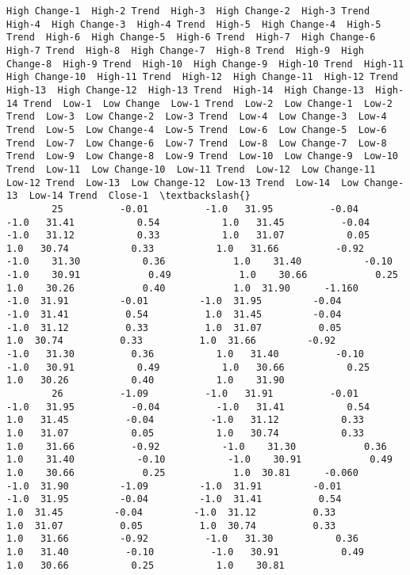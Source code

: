 \documentclass[11pt]{article}
\begin{document}
\begin{Verbatim}[commandchars=\\\{\}]
            High Change-1  High-2 Trend  High-3  High Change-2  High-3 Trend  High-4  High Change-3  High-4 Trend  High-5  High Change-4  High-5 Trend  High-6  High Change-5  High-6 Trend  High-7  High Change-6  High-7 Trend  High-8  High Change-7  High-8 Trend  High-9  High Change-8  High-9 Trend  High-10  High Change-9  High-10 Trend  High-11  High Change-10  High-11 Trend  High-12  High Change-11  High-12 Trend  High-13  High Change-12  High-13 Trend  High-14  High Change-13  High-14 Trend  Low-1  Low Change  Low-1 Trend  Low-2  Low Change-1  Low-2 Trend  Low-3  Low Change-2  Low-3 Trend  Low-4  Low Change-3  Low-4 Trend  Low-5  Low Change-4  Low-5 Trend  Low-6  Low Change-5  Low-6 Trend  Low-7  Low Change-6  Low-7 Trend  Low-8  Low Change-7  Low-8 Trend  Low-9  Low Change-8  Low-9 Trend  Low-10  Low Change-9  Low-10 Trend  Low-11  Low Change-10  Low-11 Trend  Low-12  Low Change-11  Low-12 Trend  Low-13  Low Change-12  Low-13 Trend  Low-14  Low Change-13  Low-14 Trend  Close-1  \textbackslash{}
        25          -0.01          -1.0   31.95          -0.04          -1.0   31.41           0.54           1.0   31.45          -0.04          -1.0   31.12           0.33           1.0   31.07           0.05           1.0   30.74           0.33           1.0   31.66          -0.92          -1.0    31.30           0.36            1.0    31.40           -0.10           -1.0    30.91            0.49            1.0    30.66            0.25            1.0    30.26            0.40            1.0  31.90      -1.160         -1.0  31.91         -0.01         -1.0  31.95         -0.04         -1.0  31.41          0.54          1.0  31.45         -0.04         -1.0  31.12          0.33          1.0  31.07          0.05          1.0  30.74          0.33          1.0  31.66         -0.92         -1.0   31.30          0.36           1.0   31.40          -0.10          -1.0   30.91           0.49           1.0   30.66           0.25           1.0   30.26           0.40           1.0    31.90   
        26          -1.09          -1.0   31.91          -0.01          -1.0   31.95          -0.04          -1.0   31.41           0.54           1.0   31.45          -0.04          -1.0   31.12           0.33           1.0   31.07           0.05           1.0   30.74           0.33           1.0    31.66          -0.92           -1.0    31.30            0.36            1.0    31.40           -0.10           -1.0    30.91            0.49            1.0    30.66            0.25            1.0  30.81      -0.060         -1.0  31.90         -1.09         -1.0  31.91         -0.01         -1.0  31.95         -0.04         -1.0  31.41          0.54          1.0  31.45         -0.04         -1.0  31.12          0.33          1.0  31.07          0.05          1.0  30.74          0.33          1.0   31.66         -0.92          -1.0   31.30           0.36           1.0   31.40          -0.10          -1.0   30.91           0.49           1.0   30.66           0.25           1.0    30.81   

\end{Verbatim}
\end{document}

